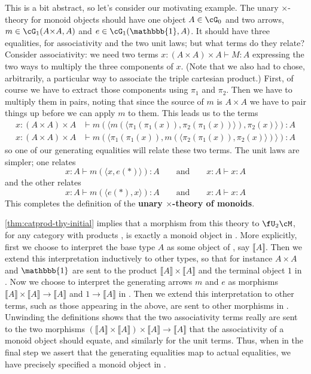 \documentclass{book}
\let\types\vdash
\def\unit{\mathbbb{1}}%
\def\ttt{\mathord{\ast}}%
\def\pair#1#2{\langle #1,#2\rangle}
\def\m#1{\llbracket #1\rrbracket}
\begin{document}
This is a bit abstract, so let's consider our motivating example.
The unary $\times$-theory for monoid objects should have one object $A\in\cG_0$ and two arrows, $m\in \cG_1(A\times A,A)$ and $e\in\cG_1(\unit,A)$.
It should have three equalities, for associativity and the two unit laws; but what terms do they relate?
Consider associativity: we need two terms $x:(A\times A)\times A \types M:A$ expressing the two ways to multiply the three components of $x$.
(Note that we also had to chose, arbitrarily, a particular way to associate the triple cartesian product.)
First, of course we have to extract those components using $\pi_1$ and $\pi_2$.
Then we have to multiply them in pairs, noting that since the source of $m$ is $A\times A$ we have to pair things up before we can apply $m$ to them.
This leads us to the terms
\begin{align*}
  x:(A\times A)\times A &\types m(\pair{m(\pair{\pi_1(\pi_1(x))}{\pi_2(\pi_1(x))})}{\pi_2(x)}) : A\\
  x:(A\times A)\times A &\types m(\pair{\pi_1(\pi_1(x))}{m(\pair{\pi_2(\pi_1(x))}{\pi_2(x)})}) : A
\end{align*}
so one of our generating equalities will relate these two terms.
The unit laws are simpler; one relates
\[ x:A \types m(\pair{x}{e(\ttt)}):A \qquad\text{and}\qquad x:A \types x:A \]
and the other relates
\[ x:A \types m(\pair{e(\ttt)}{x}):A \qquad\text{and}\qquad x:A \types x:A \]
This completes the definition of the \textbf{unary $\times$-theory of monoids}.

\cref{thm:catprod-thy-initial} implies that a morphism from this theory to $\fU_2\cM$, for any category with products \cM, is exactly a monoid object in \cM.
More explicitly, first we choose to interpret the base type $A$ as some object of \cM, say $\m A$.
Then we extend this interpretation inductively to other types, so that for instance $A\times A$ and $\unit$ are sent to the product $\m A \times \m A$ and the terminal object $1$ in \cM.
Now we choose to interpret the generating arrows $m$ and $e$ as morphisms $\m A \times \m A \to \m A$ and $1\to \m A$ in \cM.
Then we extend this interpretation to other terms, such as those appearing in the above, are sent to other morphisms in \cM.
Unwinding the definitions shows that the two associativity terms really are sent to the two morphisms $(\m A\times \m A)\times \m A \to \m A$ that the associativity of a monoid object should equate, and similarly for the unit terms.
Thus, when in the final step we assert that the generating equalities map to actual equalities, we have precisely specified a monoid object in \cM.
\end{document}
